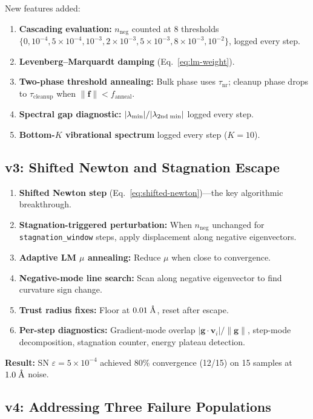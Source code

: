 \documentclass[11pt,a4paper]{article}
\newcommand{\vect}[1]{\mathbf{#1}}
\newcommand{\evec}{\vect{v}}
\newcommand{\eval}{\lambda}
\newcommand{\angstrom}{\text{\r{A}}}
\begin{document}
New features added:
\begin{enumerate}
  \item \textbf{Cascading evaluation:} $n_\text{neg}$ counted at 8 thresholds $\{0, 10^{-4}, 5\times10^{-4}, 10^{-3}, 2\times10^{-3}, 5\times10^{-3}, 8\times10^{-3}, 10^{-2}\}$, logged every step.
  \item \textbf{Levenberg--Marquardt damping} (Eq.~\ref{eq:lm-weight}).
  \item \textbf{Two-phase threshold annealing:} Bulk phase uses $\tau_\text{nr}$; cleanup phase drops to $\tau_\text{cleanup}$ when $\|\vect{f}\| < f_\text{anneal}$.
  \item \textbf{Spectral gap diagnostic:} $|\eval_\text{min}|/|\eval_\text{2nd\;min}|$ logged every step.
  \item \textbf{Bottom-$K$ vibrational spectrum} logged every step ($K=10$).
\end{enumerate}

\subsection{v3: Shifted Newton and Stagnation Escape}

\begin{enumerate}
  \item \textbf{Shifted Newton step} (Eq.~\ref{eq:shifted-newton})---the key algorithmic breakthrough.
  \item \textbf{Stagnation-triggered perturbation:} When $n_\text{neg}$ unchanged for \texttt{stagnation\_window} steps, apply displacement along negative eigenvectors.
  \item \textbf{Adaptive LM $\mu$ annealing:} Reduce $\mu$ when close to convergence.
  \item \textbf{Negative-mode line search:} Scan along negative eigenvector to find curvature sign change.
  \item \textbf{Trust radius fixes:} Floor at $0.01\;\angstrom$, reset after escape.
  \item \textbf{Per-step diagnostics:} Gradient-mode overlap $|\vect{g} \cdot \evec_i|/\|\vect{g}\|$, step-mode decomposition, stagnation counter, energy plateau detection.
\end{enumerate}

\textbf{Result:} SN $\varepsilon = 5\times10^{-4}$ achieved 80\% convergence (12/15) on 15 samples at $1.0\;\angstrom$ noise.

\subsection{v4: Addressing Three Failure Populations}
\end{document}
